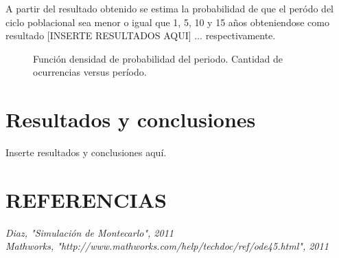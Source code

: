 \documentclass{SPANISH_acm_proc_article-sp}
\begin{document}
A partir del resultado obtenido se estima la probabilidad de que el per\'odo del ciclo
poblacional sea menor o igual que 1, 5, 10 y 15 a\~nos obteniendose como resultado
[INSERTE RESULTADOS AQUI] ... respectivamente.
\begin{figure}
\centering
\label{fig:mc}
\caption{Funci\'on densidad de probabilidad del periodo. Cantidad de ocurrencias versus per\'iodo.}
\end{figure}

\section{Resultados y conclusiones}
\label{sec:resultados}
Inserte resultados y conclusiones aqu\'i.
\section*{REFERENCIAS}
\textit{Diaz, "Simulaci\'on de Montecarlo", 2011} \\
\textit{Mathworks, "http://www.mathworks.com/help/techdoc/ref/ode45.html", 2011}
\end{document}
